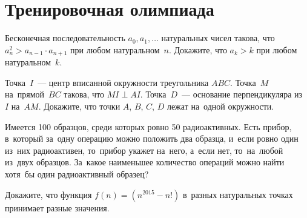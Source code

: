 
\section*{Тренировочная олимпиада}


\begin{problems}

\item
Бесконечная последовательность $a_0, a_1, \ldots$ натуральных чисел такова, что
\(
    a_{n}^2 > a_{n-1} \cdot a_{n+1}
\)
при любом натуральном~$n$.
Докажите, что $a_k > k$ при любом натуральном~$k$.

\item
Точка~$I$~--- центр вписанной окружности треугольника $ABC$.
Точка~$M$ на~прямой~$BC$ такова, что $MI \perp AI$.
Точка~$D$~--- основание перпендикуляра из~$I$ на~$AM$.
Докажите, что точки $A$, $B$, $C$, $D$ лежат на~одной окружности.

\item
Имеется 100 образцов, среди которых ровно 50 радиоактивных.
Есть прибор, в~который за~одну операцию можно положить два образца, и~если
ровно один из~них радиоактивен, то~прибор укажет на~него, а~если нет,
то~на~любой из~двух образцов.
За~какое наименьшее количество операций можно найти хотя~бы один радиоактивный
образец?

\item
Докажите, что функция $f(n) = (n^{2015} - n!)$ в~разных натуральных точках
принимает разные значения.

\end{problems}

